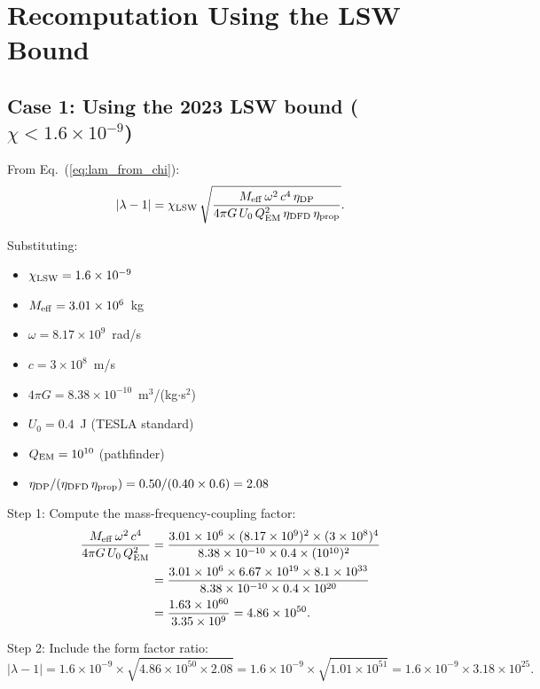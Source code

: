 \documentclass[11pt]{article}
\newcommand{\lbone}{|\lambda - 1|}
\newcommand{\Meff}{M_{\rm eff}}
\newcommand{\ee}[1]{\times 10^{#1}}
\newcommand{\QEM}{Q_{\rm EM}}
\theoremstyle{definition}
\theoremstyle{remark}
\begin{document}
\section{Recomputation Using the LSW Bound}
\label{sec:recomputation}

\subsection{Case 1: Using the 2023 LSW bound ($\chi < 1.6\ee{-9}$)}

From Eq.~(\ref{eq:lam_from_chi}):
\begin{equation}
\lbone = \chi_{\rm LSW}\,
\sqrt{\frac{\Meff\,\omega^2\,c^4\,\eta_{\rm DP}}
{4\pi G\,U_0\,\QEM^2\,\eta_{\rm DFD}\,\eta_{\rm prop}}}.
\label{eq:recompute_1}
\end{equation}

Substituting:
\begin{itemize}[nosep]
\item $\chi_{\rm LSW} = 1.6\ee{-9}$
\item $\Meff = 3.01\ee{6}$~kg
\item $\omega = 8.17\ee{9}$~rad/s
\item $c = 3\ee{8}$~m/s
\item $4\pi G = 8.38\ee{-10}$~m$^3$/(kg$\cdot$s$^2$)
\item $U_0 = 0.4$~J (TESLA standard)
\item $\QEM = 10^{10}$ (pathfinder)
\item $\eta_{\rm DP}/(\eta_{\rm DFD}\,\eta_{\rm prop}) = 0.50/(0.40\times 0.6) = 2.08$
\end{itemize}

Step 1: Compute the mass-frequency-coupling factor:
\begin{align}
\frac{\Meff\,\omega^2\,c^4}{4\pi G\,U_0\,\QEM^2}
&= \frac{3.01\ee{6}\times(8.17\ee{9})^2\times(3\ee{8})^4}
{8.38\ee{-10}\times 0.4\times(10^{10})^2} \nonumber\\
&= \frac{3.01\ee{6}\times 6.67\ee{19}\times 8.1\ee{33}}
{8.38\ee{-10}\times 0.4\times 10^{20}} \nonumber\\
&= \frac{1.63\ee{60}}{3.35\ee{9}} = 4.86\ee{50}.
\label{eq:factor}
\end{align}

Step 2: Include the form factor ratio:
\begin{equation}
\lbone = 1.6\ee{-9}\times\sqrt{4.86\ee{50}\times 2.08}
= 1.6\ee{-9}\times\sqrt{1.01\ee{51}}
= 1.6\ee{-9}\times 3.18\ee{25}.
\label{eq:step2}
\end{equation}
\end{document}
